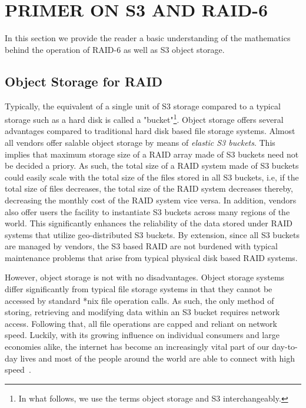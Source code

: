 \section{PRIMER ON S3 AND RAID-6}
\label{sec:primer}

In this section we provide the reader a basic understanding of the mathematics behind the operation of RAID-6 as well as S3 object storage.

\subsection{Object Storage for RAID}
Typically, the equivalent of a single unit of S3 storage compared to a typical storage such as a hard disk is called a "bucket"\footnote{In what follows, we use the terms object storage and S3 interchangeably.
}. 
Object storage offers several advantages compared to traditional hard disk based file storage systems.
Almost all vendors offer salable object storage by means of \textit{elastic S3 buckets}.
This implies that maximum storage size of a RAID array made of S3 buckets need not be decided a priory.
As such, the total size of a RAID system made of S3 buckets could easily scale with the total size of the files stored in all S3 buckets, i.e, if the total size of files decreases, the total size of the RAID system decreases thereby, decreasing the monthly cost of the RAID system vice versa.
In addition, vendors also offer users the facility to instantiate S3 buckets across many regions of the world.
This significantly enhances the reliability of the data stored under RAID systems that utilize geo-distributed S3 buckets.
By extension, since all S3 buckets are managed by vendors, the S3 based RAID are not burdened with typical maintenance problems that arise from typical physical disk based RAID systems.

However, object storage is not with no disadvantages.
Object storage systems differ significantly from typical file storage systems in that they cannot be accessed by standard *nix file operation calls.
As such, the only method of storing, retrieving and modifying data within an S3 bucket requires network access.
Following that, all file operations are capped and reliant on network speed. Luckily, with its growing influence on individual consumers and large economies alike, the internet has become an increasingly vital part of our day-to-day lives and most of the people around the world are able to connect with high speed~\cite{statistica_2020, speedTest_2020}.

